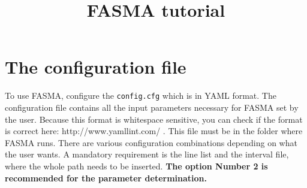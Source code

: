 \documentclass[a4paper,12pt]{article}
\title{FASMA tutorial}
\author{}
\begin{document}
\maketitle


\section{The configuration file}

To use FASMA, configure the \texttt{config.cfg} which is in YAML format. The configuration file contains all the input parameters necessary for FASMA set by the user. 
Because this format is whitespace sensitive, you can check if the format is correct here: http://www.yamllint.com/ . This file must be in the folder where FASMA runs. 
There are various configuration combinations depending on what the user wants. A mandatory requirement is the line list and the interval file, where the whole path needs to be inserted. 
{\bf The option Number 2 is recommended for the parameter determination.}
\end{document}
